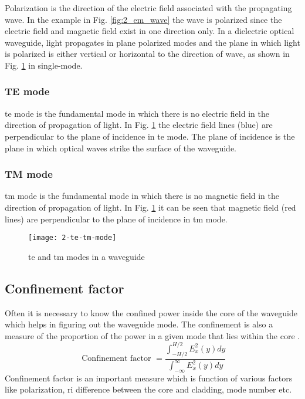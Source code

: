 \documentclass[../report.tex]{subfiles}
\begin{document}
Polarization is the direction of the electric field associated with the propagating wave. In the example in Fig. \ref{fig:2_em_wave} the wave is polarized since the electric field and magnetic field exist in one direction only. In a dielectric optical waveguide, light propagates in plane polarized modes and the plane in which light is polarized is either vertical or horizontal to the direction of wave, as shown in Fig. \ref{fig:2_te_tm_mode} in single-mode.
		
			\subsubsection{TE mode}
\gls{te} mode is the fundamental mode in which there is no electric field in the direction of propagation of light. In Fig. \ref{fig:2_te_tm_mode} the electric field lines (blue) are perpendicular to the plane of incidence in \gls{te} mode. The plane of incidence is the plane in which optical waves strike the surface of the waveguide.						
			\subsubsection{TM mode}
\gls{tm} mode is the fundamental mode in which there is no magnetic field in the direction of propagation of light. In Fig. \ref{fig:2_te_tm_mode} it can be seen that magnetic field (red lines) are perpendicular to the plane of incidence in \gls{tm} mode.					

\begin{figure}[H]
	\centering
	\texttt{[image: 2-te-tm-mode]}
	\caption{\gls{te} and \gls{tm} modes in a waveguide}
	\label{fig:2_te_tm_mode}
\end{figure}
			
		\subsection{Confinement factor}
Often it is necessary to know the confined power inside the core of the waveguide which helps in figuring out the waveguide mode. The confinement is also a measure of the proportion of the power in a given mode that lies within the core \cite{reed_silicon_2008}.  
\begin{equation}\label{eq:per}
\text{ Confinement factor } = \dfrac {\int _{-H / 2}^{H/2}E_{x}^{2}\left( y\right) dy} {\int _{-\infty }^{\infty }E_{x}^{2}\left( y\right) dy}
\end{equation}
Confinement factor is an important measure which is function of various factors like polarization, \gls{ri} difference between the core and cladding, mode number etc.	
		
\end{document}
